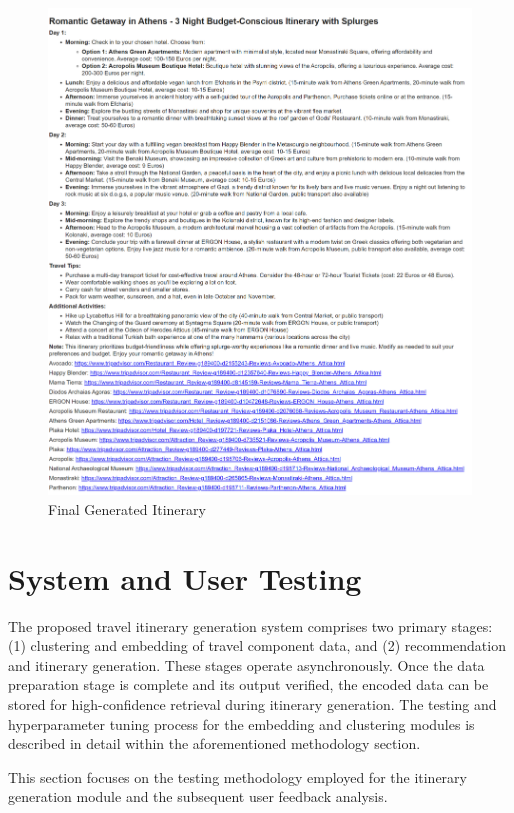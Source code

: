 \documentclass[12pt,a4paper]{report}
\begin{document}
\begin{figure}[H]
    \centering
    \includegraphics[scale=.8]{finalitinerary}
    \caption{Final Generated Itinerary}
   \label{fig:itinerary}
\end{figure}
\chapter{System and User Testing}


The proposed travel itinerary generation system comprises two primary stages: (1) clustering and embedding of travel component data, and (2) recommendation and itinerary generation. These stages operate asynchronously. Once the data preparation stage is complete and its output verified, the encoded data can be stored for high-confidence retrieval during itinerary generation. The testing and hyperparameter tuning process for the embedding and clustering modules is described in detail within the aforementioned methodology section.

This section focuses on the testing methodology employed for the itinerary generation module and the subsequent user feedback analysis.
\end{document}
